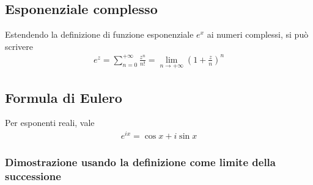 \documentclass[letterpaper,10pt,italian]{jupyterBook}
\begin{document}
\subsection{Esponenziale complesso}
\label{\detokenize{ch/algebra/complex-algebra-notes:esponenziale-complesso}}\label{\detokenize{ch/algebra/complex-algebra-notes:math-hs-algebra-complex-notes-complex-exp}}
\sphinxAtStartPar
Estendendo la definizione di funzione esponenziale \(e^x\) ai numeri complessi, si può scrivere
\begin{equation}\label{equation:ch/algebra/complex-algebra-notes:complex:complex-exp:notes}
\begin{split}e^z = \sum_{n = 0}^{+\infty} \frac{z^n}{n!} = \lim_{n \rightarrow +\infty} \left( 1 + \frac{z}{n} \right)^n\end{split}
\end{equation}



\subsection{Formula di Eulero}
\label{\detokenize{ch/algebra/complex-algebra-notes:formula-di-eulero}}\label{\detokenize{ch/algebra/complex-algebra-notes:math-hs-algebra-complex-notes-euler}}
\sphinxAtStartPar
Per esponenti reali, vale
\begin{equation*}
\begin{split}e^{i x} = \cos x + i \sin x\end{split}
\end{equation*}\subsubsection*{Dimostrazione usando la definizione come limite della successione}
\end{document}
